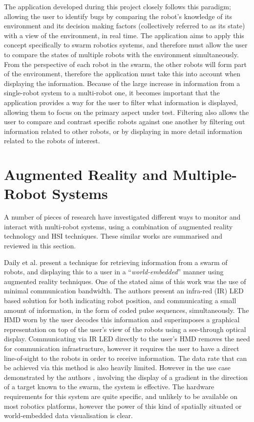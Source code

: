 The application developed during this project closely follows this paradigm; allowing the user to identify bugs by comparing the robot's knowledge of its environment and its decision making factors (collectively referred to as its state) with a view of the environment, in real time. The application aims to apply this concept specifically to swarm robotics systems, and therefore must allow the user to compare the states of multiple robots with the environment simultaneously. From the perspective of each robot in the swarm, the other robots will form part of the environment, therefore the application must take this into account when displaying the information. Because of the large increase in information from a single-robot system to a multi-robot one, it becomes important that the application provides a way for the user to filter what information is displayed, allowing them to focus on the primary aspect under test. Filtering also allows the user to compare and contrast specific robots against one another by filtering out information related to other robots, or by displaying in more detail information related to the robots of interest.

\section{Augmented Reality and Multiple-Robot Systems} \label{SimilarWork}
A number of pieces of research have investigated different ways to monitor and interact with multi-robot systems, using a combination of augmented reality technology and HSI techniques. These similar works are summarised and reviewed in this section.

Daily et al. \cite{Daily:2003} present a technique for retrieving information from a swarm of robots, and displaying this to a user in a ``\textit{world-embedded}'' manner using augmented reality techniques. One of the stated aims of this work was the use of minimal communication bandwidth. The authors present \cite{Daily:2003} an infra-red (IR) LED based solution for both indicating robot position, and communicating a small amount of information, in the form of coded pulse sequences, simultaneously. The HMD worn by the user decodes this information and superimposes a graphical representation on top of the user's view of the robots using a see-through optical display. Communicating via IR LED directly to the user's HMD removes the need for communication infrastructure, however it requires the user to have a direct line-of-sight to the robots in order to receive information. The data rate that can be achieved via this method is also heavily limited. However in the use case demonstrated by the authors \cite{Daily:2003}, involving the display of a gradient in the direction of a target known to the swarm, the system is effective. The hardware requirements for this system are quite specific, and unlikely to be available on most robotics platforms, however the power of this kind of spatially situated or world-embedded data visualisation is clear.

